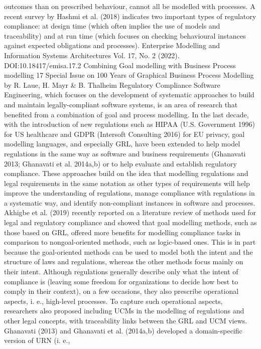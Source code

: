 outcomes than on prescribed behaviour, cannot all
be modelled with processes. A recent survey by
Hashmi et al. (2018) indicates two important types
of regulatory compliance: at design time (which
often implies the use of models and traceability)
and at run time (which focuses on checking behavioural instances against expected obligations
and processes).
Enterprise Modelling and Information Systems Architectures
Vol. 17, No. 2 (2022). DOI:10.18417/emisa.17.2
Combining Goal modelling with Business Process modelling 17
Special Issue on 100 Years of Graphical Business Process Modelling by R. Laue, H. Mayr & B. Thalheim
Regulatory Compliance Software Engineering,
which focuses on the development of systematic approaches to build and maintain legally-compliant
software systems, is an area of research that benefited from a combination of goal and process
modelling. In the last decade, with the introduction of new regulations such as HIPAA (U.S.
Government 1996) for US healthcare and GDPR
(Intersoft Consulting 2016) for EU privacy, goal
modelling languages, and especially GRL, have
been extended to help model regulations in the
same way as software and business requirements
(Ghanavati 2013; Ghanavati et al. 2014a,b) or to
help evaluate and establish regulatory compliance.
These approaches build on the idea that modelling regulations and legal requirements in the
same notation as other types of requirements will
help improve the understanding of regulations,
manage compliance with regulations in a systematic way, and identify non-compliant instances in
software and processes. Akhigbe et al. (2019)
recently reported on a literature review of methods used for legal and regulatory compliance and
showed that goal modelling methods, such as
those based on GRL, offered more benefits for
modelling compliance tasks in comparison to nongoal-oriented methods, such as logic-based ones.
This is in part because the goal-oriented methods
can be used to model both the intent and the structure of laws and regulations, whereas the other
methods focus mainly on their intent. Although
regulations generally describe only what the intent
of compliance is (leaving some freedom for organizations to decide how best to comply in their
context), on a few occasions, they also prescribe
operational aspects, i. e., high-level processes. To
capture such operational aspects, researchers also
proposed including UCMs in the modelling of regulations and other legal concepts, with traceability
links between the GRL and UCM views.
Ghanavati (2013) and Ghanavati et al. (2014a,b)
developed a domain-specific version of URN (i. e.,

